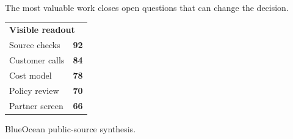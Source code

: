 \documentclass[10pt,a4paper]{article}
\begin{document}
\vspace{1pt}\noindent\begin{minipage}[t]{0.56\linewidth}
{\footnotesize\color{BOText} The most valuable work closes open questions that can change the decision.}\par
\end{minipage}\hfill\begin{minipage}[t]{0.36\linewidth}
{\scriptsize\color{BOText}\begin{tabular}{p{31mm}>{\raggedleft\arraybackslash}p{18mm}}
\multicolumn{2}{l}{\textcolor{BOGreen}{\bfseries Visible readout}}\\[2pt]
Source checks & \textbf{92}\\[1pt]
Customer calls & \textbf{84}\\[1pt]
Cost model & \textbf{78}\\[1pt]
Policy review & \textbf{70}\\[1pt]
Partner screen & \textbf{66}\\[1pt]
\end{tabular}}\par
\end{minipage}\par\vspace{1pt}
\par
{\scriptsize\color{BOMuted} BlueOcean public-source synthesis.}\par
\end{document}

